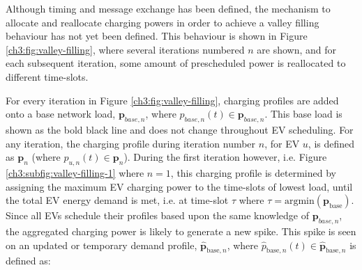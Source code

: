 Although timing and message exchange has been defined, the mechanism to allocate and reallocate charging powers in order to achieve a valley filling behaviour has not yet been defined.
This behaviour is shown in Figure \ref{ch3:fig:valley-filling}, where several iterations numbered $n$ are shown, and for each subsequent iteration, some amount of prescheduled power is reallocated to different time-slots.




For every iteration in Figure \ref{ch3:fig:valley-filling}, charging profiles are added onto a base network load, $\textbf{p}_{base,n}$, where $p_{base,n}(t) \in \textbf{p}_{base,n}$.
This base load is shown as the bold black line and does not change throughout EV scheduling.
For any iteration, the charging profile during iteration number $n$, for EV $u$, is defined as $\textbf{p}_n$ (where $p_{u,n}(t) \in \textbf{p}_n$).
During the first iteration however, i.e. Figure \ref{ch3:subfig:valley-filling-1} where $n=1$, this charging profile is determined by assigning the maximum EV charging power to the time-slots of lowest load, until the total EV energy demand is met, i.e. at time-slot $\tau$ where $\tau = \text{argmin}(\textbf{p}_\text{base})$.
Since all EVs schedule their profiles based upon the same knowledge of $\textbf{p}_{base,n}$, the aggregated charging power is likely to generate a new spike.
This spike is seen on an updated or temporary demand profile, $\hat{\textbf{p}}_{\text{base}, n}$, where $\hat{p}_{\text{base}, n}(t) \in \hat{\textbf{p}}_{\text{base}, n}$ is defined as:





